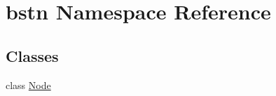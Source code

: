 \hypertarget{namespacebstn}{}\section{bstn Namespace Reference}
\label{namespacebstn}
\subsection*{Classes}
\begin{DoxyCompactItemize}
\item 
class \hyperlink{classbstn_1_1_node}{Node}
\end{DoxyCompactItemize}
